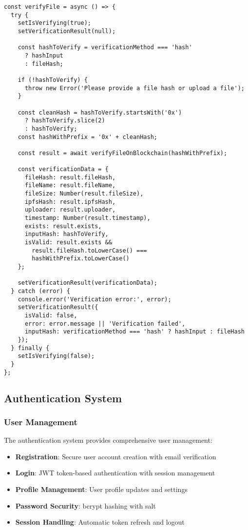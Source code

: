 \documentclass[11pt,a4paper]{article}
\begin{document}
\begin{lstlisting}[style=javascript, caption=File Verification Implementation]
const verifyFile = async () => {
  try {
    setIsVerifying(true);
    setVerificationResult(null);
    
    const hashToVerify = verificationMethod === 'hash' 
      ? hashInput 
      : fileHash;
    
    if (!hashToVerify) {
      throw new Error('Please provide a file hash or upload a file');
    }

    const cleanHash = hashToVerify.startsWith('0x') 
      ? hashToVerify.slice(2) 
      : hashToVerify;
    const hashWithPrefix = '0x' + cleanHash;

    const result = await verifyFileOnBlockchain(hashWithPrefix);
    
    const verificationData = {
      fileHash: result.fileHash,
      fileName: result.fileName,
      fileSize: Number(result.fileSize),
      ipfsHash: result.ipfsHash,
      uploader: result.uploader,
      timestamp: Number(result.timestamp),
      exists: result.exists,
      inputHash: hashToVerify,
      isValid: result.exists && 
        result.fileHash.toLowerCase() === 
        hashWithPrefix.toLowerCase()
    };

    setVerificationResult(verificationData);
  } catch (error) {
    console.error('Verification error:', error);
    setVerificationResult({
      isValid: false,
      error: error.message || 'Verification failed',
      inputHash: verificationMethod === 'hash' ? hashInput : fileHash
    });
  } finally {
    setIsVerifying(false);
  }
};
\end{lstlisting}

\subsection{Authentication System}

\subsubsection{User Management}
The authentication system provides comprehensive user management:

\begin{itemize}
    \item \textbf{Registration}: Secure user account creation with email verification
    \item \textbf{Login}: JWT token-based authentication with session management
    \item \textbf{Profile Management}: User profile updates and settings
    \item \textbf{Password Security}: bcrypt hashing with salt
    \item \textbf{Session Handling}: Automatic token refresh and logout
\end{itemize}
\end{document}

